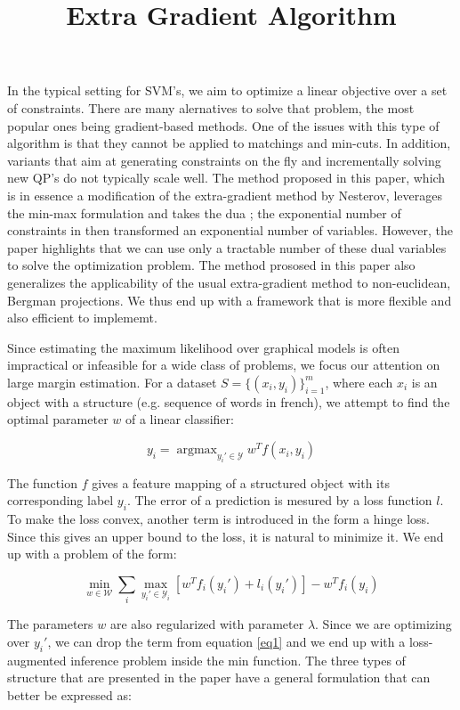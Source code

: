 \documentclass{article}
\DeclareMathOperator*{\argmax}{\arg\max}
\begin{document}
\title{Extra Gradient Algorithm}

In the typical setting for SVM's, we aim to optimize a linear objective over a set of constraints. There are many alernatives to solve that problem, the most popular ones being gradient-based methods. One of the issues with this type of algorithm is that they cannot be applied to matchings and min-cuts. In addition, variants that aim at generating constraints on the fly and incrementally solving new QP's do not typically scale well. The method proposed in this paper, which is in essence a modification of the extra-gradient method by Nesterov, leverages the min-max formulation and takes the dua ; the exponential number of constraints in then transformed an exponential number of variables. However, the paper highlights that we can use only a tractable number of these dual variables to solve  the optimization problem. The method prososed in this paper also generalizes the applicability of the usual extra-gradient method to non-euclidean, Bergman projections. We thus end up with a framework that is more flexible and also efficient to implememt. 

Since estimating the maximum likelihood over graphical models is often impractical or infeasible for a wide class of problems, we focus our attention on large margin estimation. For a dataset $ S = \{ (x_i, y_i) \}_{i=1}^{m} $, where each $x_i$ is an object with a structure (e.g. sequence of words in french), we attempt to find the optimal parameter $w$ of a linear classifier:

\begin{equation}
  y_i = \argmax_{y_i' \in \mathcal{Y}} w^T f(x_i,y_i)
  \label{eq1}
\end{equation}

The function $f$ gives a feature mapping of a structured object with its corresponding label $y_i$. The error of a prediction is mesured by a loss function $l$. To make the loss convex, another term is introduced in the form a hinge loss. Since this gives an upper bound to the loss, it is natural to minimize it. We end up with a problem of the form:

\begin{equation}
  \min_{w \in \mathcal{W}} \sum_i \max_{y_i' \in \mathcal{Y}_i} \left[ w^T f_i(y_i') + l_i(y_i') \right] - w^T f_i(y_i)
\end{equation}

The parameters $w$ are also regularized with parameter $\lambda$. Since we are optimizing over $y_i'$, we can drop the term from equation \ref{eq1} and we end up with a loss-augmented inference problem inside the min function. The three types of structure that are presented in the paper have a general formulation that can better be expressed as:
\end{document}
